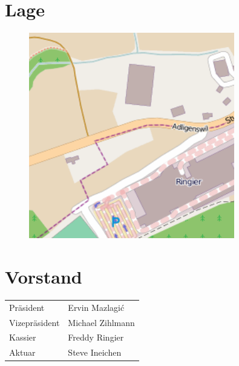 \documentclass[10pt,foldmark,notumble]{leaflet}
\begin{document}
\section{Lage}
\begin{figure}[h!]
\centering
\includegraphics[width=0.8\textwidth]{lux_lage.png}
\end{figure}

\section{Vorstand}
\begin{table}[h!]
        \begin{tabular}{ll}
        Präsident       & Ervin Mazlagi\'c\\
        Vizepräsident   & Michael Zihlmann\\
        Kassier         & Freddy Ringier\\
        Aktuar          & Steve Ineichen 
        \end{tabular}
\end{table}
\end{document}
